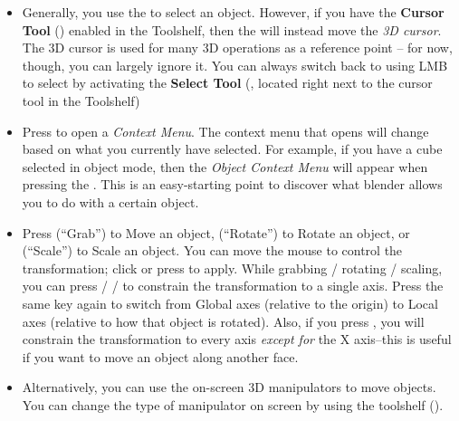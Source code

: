 \documentclass[11pt]{article}
\begin{document}
\begin{itemize}
    \item Generally, you use the  to select an object.  However, if you have
    the {\bf Cursor Tool} ()
    enabled in the Toolshelf, then the  will instead move the 
    \textit{3D cursor}.  The 3D cursor is used for many 3D operations as a reference point -- for
    now, though, you can largely ignore it.  You can always switch back to using LMB to select by
    activating the {\bf Select Tool} (,
    located right next to the cursor tool in the Toolshelf)
    \item Press  to open a {\it Context Menu}.  The context menu that opens
    will change based on what you currently have selected.  For example, if you have a cube selected
    in object mode, then the {\it Object Context Menu} will appear when pressing the .  This is an easy-starting point to discover what blender allows you to do with a
    certain object.
    \item Press  (``Grab'') to Move an object,  (``Rotate'') to Rotate an object,
    or  (``Scale'') to Scale an object.  You can move the mouse to control the 
    transformation; click  or press \keys{\return} to apply.  While grabbing
    / rotating / scaling, you can press  /  /  to constrain the 
    transformation to a single axis.  Press the same key again to switch from Global axes (relative
    to the origin) to Local axes (relative to how that object is rotated).  Also, if you press
    , you will constrain the transformation to every axis \textit{except for} the X
    axis--this is useful if you want to move an object along another face.
    \item Alternatively, you can use the on-screen 3D manipulators to move objects.  You can change
    the type of manipulator on screen by using the toolshelf 
    ().

\end{itemize}
\end{document}
